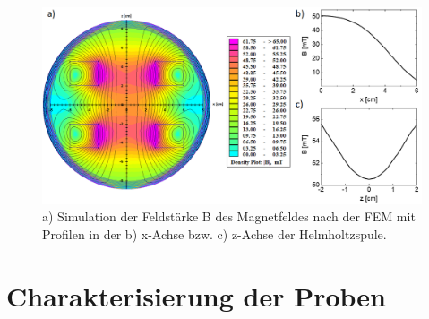 \begin{figure}[h] \centering
\includegraphics[width=1\textwidth]{Bilder/Methodik/Sim_mag_komplett}
\caption[Simulation des Magnetfeldes der Spule]{a) Simulation der Feldstärke B
des Magnetfeldes nach der FEM mit Profilen in der b) x-Achse bzw. c) z-Achse der
Helmholtzspule.} \label{Sim} \end{figure} \section{Charakterisierung der Proben}

